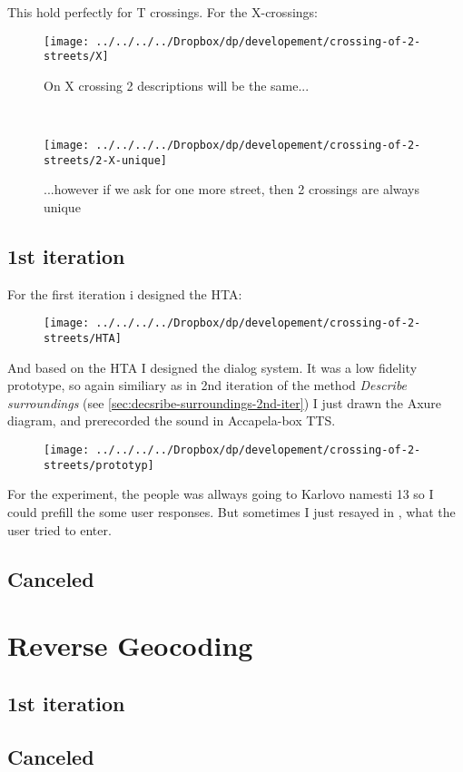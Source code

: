 		This hold perfectly for T crossings. For the X-crossings:
		\begin{figure*}[ht]
			\centering
			\begin{subfigure}[t]{0.45\textwidth}
				\centering
				\texttt{[image: ../../../../Dropbox/dp/developement/crossing-of-2-streets/X]}
				\caption[]{On X crossing 2 descriptions will be the same...}
				\label{fig:from}
			\end{subfigure}%
			~ 
			\begin{subfigure}[t]{0.45\textwidth}
				\centering
				\texttt{[image: ../../../../Dropbox/dp/developement/crossing-of-2-streets/2-X-unique]}
				\caption[]{...however if we ask for one more street, then 2 crossings are always unique}
				\label{fig:to}
			\end{subfigure}
			
			\caption{}
		\end{figure*}
		
		
			\subsection{1st iteration}
				For the first iteration i designed the HTA:
					\begin{figure}[th]
						\centering
						\texttt{[image: ../../../../Dropbox/dp/developement/crossing-of-2-streets/HTA]}
						\caption{}
						\label{fig:hta}
					\end{figure}
				And based on the HTA I designed the dialog system. It was a low fidelity prototype, so again similiary as in 2nd iteration of the method \emph{Describe surroundings} (see \ref{sec:decsribe-surroundings-2nd-iter}) I just drawn the Axure\cite{axure} diagram, and prerecorded the sound in Accapela-box\cite{accapela} TTS.
				
					\begin{figure}[th]
						\centering
						\texttt{[image: ../../../../Dropbox/dp/developement/crossing-of-2-streets/prototyp]}
						\caption{}
						\label{fig:prototyp-crossing-of-two}
					\end{figure}
				
				For the experiment, the people was allways going to Karlovo namesti 13 so I could prefill the some user responses. But sometimes I just resayed in , what the user tried to enter.
				
			\subsection{Canceled}
		\section{Reverse Geocoding}
			\subsection{1st iteration}
			\subsection{Canceled}
		
		